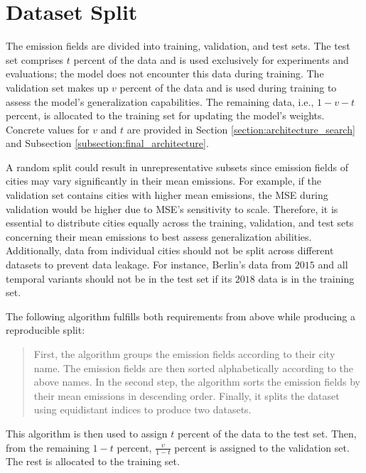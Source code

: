 \section{Dataset Split}
The emission fields are divided into training, validation, and test sets.
The test set comprises $t$ percent of the data and is used exclusively for experiments and evaluations; the model does not encounter this data during training.
The validation set makes up $v$ percent of the data and is used during training to assess the model's generalization capabilities.
The remaining data, i.e., $1-v-t$ percent, is allocated to the training set for updating the model's weights.
Concrete values for $v$ and $t$ are provided in Section \ref{section:architecture_search} and Subsection \ref{subsection:final_architecture}.

A random split could result in unrepresentative subsets since emission fields of cities may vary significantly in their mean emissions.
For example, if the validation set contains cities with higher mean emissions, the \gls{MSE} during validation would be higher due to \gls{MSE}'s sensitivity to scale.
Therefore, it is essential to distribute cities equally across the training, validation, and test sets concerning their mean emissions to best assess generalization abilities.
Additionally, data from individual cities should not be split across different datasets to prevent data leakage.
For instance, Berlin's data from $2015$ and all temporal variants should not be in the test set if its $2018$ data is in the training set.

The following algorithm fulfills both requirements from above while producing a reproducible split:

\begin{quotation}
First, the algorithm groups the emission fields according to their city name.
The emission fields are then sorted alphabetically according to the above names.
In the second step, the algorithm sorts the emission fields by their mean emissions in descending order.
Finally, it splits the dataset using equidistant indices to produce two datasets.
\end{quotation}

This algorithm is then used to assign $t$ percent of the data to the test set.
Then, from the remaining $1 - t$ percent, $\frac{v}{1 - t}$ percent is assigned to the validation set.
The rest is allocated to the training set.

